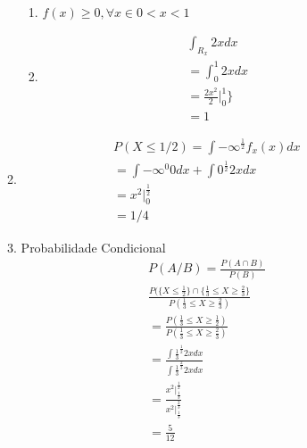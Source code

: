 \documentclass[11pt,a4paper]{book}
\begin{document}
\begin{description}
\begin{enumerate}[label=(\alph*)]
\begin{enumerate}[leftmargin=*, label=\Roman*., widest=IV, align=left]
               \begin{enumerate} %
                 \item $f(x)\geq 0, \forall x \in  0<x<1$
                 \item 
                   \begin{align*}
                     \int_{R_x} 2x dx\\
                     =\int_{0}^1 2x dx\\ 
                   = \frac{2x^2}{2}|^1_0 \}\\
                   = 1
                 \end{align*}
             \end{enumerate}

           \item 
             \begin{align*}
               P(X \leq 1/2) = \int{-\infty}^{\frac{1}{2}} f_x (x) dx\\
               = \int{-\infty}^0 0 dx + \int{0}^{\frac{1}{2}} 2x dx \\
               = x^2 |^{\frac{1}{2}}_0\\
               = 1/4
             \end{align*}
           \item Probabilidade Condicional
             \begin{align*}
               P(A/B)= \frac{P(A\cap B)}{P(B)} \\
               \frac{ P(\{X \leq \frac{1}{2}\} \cap \{ \frac{1}{3} \leq X \geq \frac{2}{3}\}}{P ( \frac{1}{3} \leq X \geq \frac{2}{3} )}\\
               = \frac{P( \frac{1}{3} \leq X \geq \frac{1}{2} )}{P( \frac{1}{3} \leq X \geq \frac{2}{3} )}\\
               = \frac{\int{\frac{1}{3}}^{\frac{1}{2}} 2x dx}{\int{\frac{1}{3}}^{\frac{2}{3}}2x dx} \\
               = \frac{x^2 |^{\frac{1}{2}}_{\frac{1}{3}}}{x^2 |^{\frac{2}{3}}_{\frac{1}{3}}}\\
               = \frac{5}{12}
             \end{align*}
         \end{enumerate}
     \end{enumerate}

 \end{description}
\end{document}
